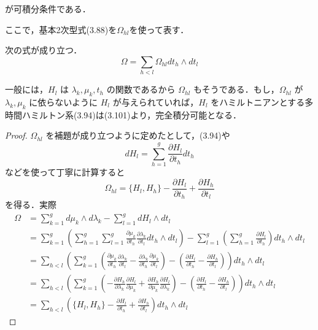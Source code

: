 が可積分条件である．
\begin{story}
ここで，基本2次型式(3.88)を$\Omega_{hl}$を使って表す．

\begin{lemma}[3.13]
次の式が成り立つ．
\begin{equation*}
    \Omega = \sum_{h<l} \Omega_{hl} dt_h \wedge dt_l
\end{equation*}
\end{lemma}

一般には，$H_l$ は $\lambda_k, \mu_k, t_h$ の関数であるから $\Omega_{hl}$ もそうである．もし，$\Omega_{hl}$ が $\lambda_k, \mu_k$ に依らないように $H_l$ が与えられていれば，$H_l$ をハミルトニアンとする多時間ハミルトン系(3.94)は(3.101)より，完全積分可能となる．

\begin{proof}$\Omega_{hl}$ を補題が成り立つように定めたとして，(3.94)や
\begin{equation*}
    dH_l = \sum_{h=1}^g \frac{\partial H_l}{\partial t_h} dt_h
\end{equation*}
などを使って丁寧に計算すると
\begin{equation*}
    \Omega_{hl} = \{H_l, H_h\} - \frac{\partial H_l}{\partial t_h} + \frac{\partial H_h}{\partial t_l}
\end{equation*}
を得る．実際
\begin{align*}
    \Omega &= \sum_{k=1}^g d\mu_k \wedge d\lambda_k - \sum_{l=1}^g dH_l \wedge dt_l \\
    &= \sum_{k=1}^g \left( \sum_{h=1}^g \sum_{l=1}^g \frac{\partial \mu_k}{\partial t_h} \frac{\partial \lambda_k}{\partial t_l} dt_h \wedge dt_l \right) - \sum_{l=1}^g \left( \sum_{h=1}^g \frac{\partial H_l}{\partial t_h} \right) dt_h \wedge dt_l \\
    &= \sum_{h<l} \left( \sum_{k=1}^g \left( \frac{\partial \mu_k}{\partial t_h} \frac{\partial \lambda_k}{\partial t_l} - \frac{\partial \lambda_k}{\partial t_h} \frac{\partial \mu_k}{\partial t_l} \right) - \left( \frac{\partial H_l}{\partial t_h} - \frac{\partial H_h}{\partial t_l} \right) \right) dt_h \wedge dt_l \\
    &= \sum_{h<l} \left( \sum_{k=1}^g \left( -\frac{\partial H_h}{\partial \lambda_k} \frac{\partial H_l}{\partial \mu_k} + \frac{\partial H_h}{\partial \mu_k} \frac{\partial H_l}{\partial \lambda_k} \right) - \left( \frac{\partial H_l}{\partial t_h} - \frac{\partial H_h}{\partial t_l} \right) \right) dt_h \wedge dt_l \\
    &= \sum_{h<l} \left( \lbrace H_l, H_h \rbrace - \frac{\partial H_l}{\partial t_h} + \frac{\partial H_h}{\partial t_l} \right) dt_h \wedge dt_l

\end{align*}
\end{proof}
\end{story}

